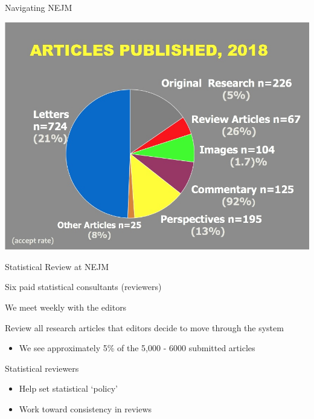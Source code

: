 \documentclass[ignorenonframetext,]{beamer}
\providecommand{\tightlist}{%
  \setlength{\itemsep}{0pt}\setlength{\parskip}{0pt}}
\begin{document}
\begin{frame}{Navigating NEJM}
\protect\hypertarget{navigating-nejm}{}

\centering

\includegraphics[width=1\textwidth,height=\textheight]{../figures/articles_published_2018.jpeg}

\end{frame}

\begin{frame}{Statistical Review at NEJM}
\protect\hypertarget{statistical-review-at-nejm}{}

Six paid statistical consultants (reviewers)

We meet weekly with the editors

Review all research articles that editors decide to move through the
system

\begin{itemize}
\tightlist
\item
  We see approximately 5\% of the 5,000 - 6000 submitted articles
\end{itemize}

Statistical reviewers

\begin{itemize}
\item
  Help set statistical `policy'
\item
  Work toward consistency in reviews
\end{itemize}

\end{frame}
\end{document}
